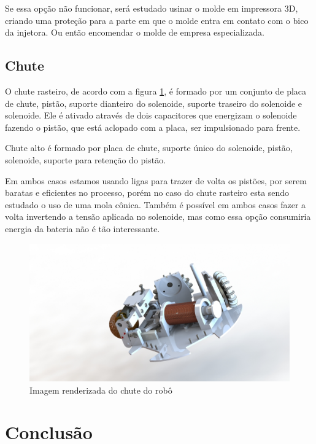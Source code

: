 \documentclass[conference]{IEEEtran}
\begin{document}
Se essa opção não funcionar, será estudado usinar o molde em impressora 3D, criando uma proteção para a parte em que o molde entra em contato com o bico da injetora. Ou então encomendar o molde de empresa especializada.

\subsection{Chute}

O chute rasteiro, de acordo com a figura  \ref{img:alterarlabel}, é formado por um conjunto de placa de chute, pistão, suporte dianteiro do solenoide, suporte traseiro do solenoide e solenoide. Ele é ativado através de dois capacitores que energizam o solenoide fazendo o pistão, que está aclopado com a placa, ser impulsionado para frente.

Chute alto é formado por placa de chute, suporte único do solenoide, pistão, solenoide, suporte para retenção do pistão. 

Em ambos casos estamos usando ligas para trazer de volta os pistões, por serem baratas e eficientes no processo, porém no caso do chute rasteiro esta sendo estudado o uso de uma mola cônica. Também é possível em ambos casos fazer a volta invertendo a tensão aplicada no solenoide, mas como essa opção consumiria energia da bateria não é tão interessante.

\begin{figure}[thpb]	
	\centering
	\includegraphics[width=\linewidth]{img/mec11}
	\caption{Imagem renderizada do chute do robô}
	\label{img:alterarlabel}
\end{figure}

\section{Conclusão}
\end{document}
